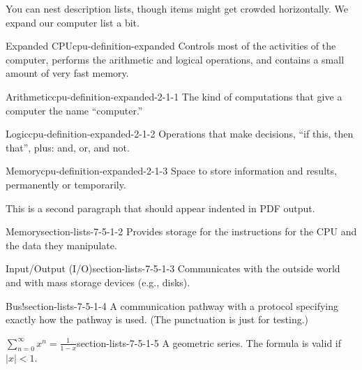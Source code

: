 \documentclass{amsart}
\theoremstyle{plain}%
\theoremstyle{definition}%
\theoremstyle{remark}%
\numberwithin{equation}{section}
\begin{document}
%
\par
You can nest description lists, though items might get crowded horizontally.  We expand our computer list a bit.%
\begin{descriptionlist}
\begin{dlimedium}{Expanded CPU}{cpu-definition-expanded}%
Controls most of the activities of the computer, performs the arithmetic and logical operations, and contains a small amount of very fast memory.%
\begin{descriptionlist}
\begin{dlimedium}{Arithmetic}{cpu-definition-expanded-2-1-1}%
The kind of computations that give a computer the name ``computer.''%
\end{dlimedium}%
\begin{dlimedium}{Logic}{cpu-definition-expanded-2-1-2}%
Operations that make decisions, ``if this, then that'', plus: and, or, and not.%
\end{dlimedium}%
\begin{dlimedium}{Memory}{cpu-definition-expanded-2-1-3}%
Space to store information and results, permanently or temporarily.%
\end{dlimedium}%
\end{descriptionlist}
%
\par
This is a second paragraph that should appear indented in PDF output.%
\end{dlimedium}%
\begin{dlimedium}{Memory}{section-lists-7-5-1-2}%
Provides storage for the instructions for the CPU and the data they manipulate.%
\end{dlimedium}%
\begin{dlimedium}{Input\slash{}Output (I\slash{}O)}{section-lists-7-5-1-3}%
Communicates with the outside world and with mass storage devices (e.g.\@, disks).%
\end{dlimedium}%
\begin{dlimedium}{Bus!}{section-lists-7-5-1-4}%
A communication pathway with a protocol specifying exactly how the pathway is used. (The punctuation is just for testing.)%
\end{dlimedium}%
\begin{dlimedium}{\(\displaystyle \sum_{n=0}^\infty x^n = \frac{1}{1-x}\)}{section-lists-7-5-1-5}%
A geometric series.  The formula is valid if \(|x| < 1\).%
\end{dlimedium}%
\end{descriptionlist}
%
%
%
\typeout{************************************************}
\typeout{************************************************}
%
\end{document}

